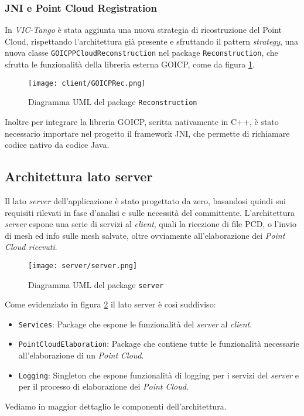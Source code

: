 \subsubsection{JNI e Point Cloud Registration}
In \emph{VIC-Tango} è stata aggiunta una nuova strategia di ricostruzione del Point Cloud, rispettando l'architettura già presente e sfruttando il pattern \emph{strategy}, una nuova classe \texttt{GOICPPCloudReconstruction} nel package \texttt{Reconstruction}, che sfrutta le funzionalità della libreria esterna GOICP, come da figura \ref{fig:GOICPRec}.
\begin{figure}[!h] 
    \centering 
    \texttt{[image: client/GOICPRec.png]} 
    \caption{Diagramma UML del package \texttt{Reconstruction}}
   \label{fig:GOICPRec}
\end{figure}
Inoltre per integrare la libreria GOICP, scritta nativamente in C++, è stato necessario importare nel progetto il framework JNI, che permette di richiamare codice nativo da codice Java.
\newpage



\subsection{Architettura lato server}
Il lato \emph{server} dell'applicazione è stato progettato da zero, basandosi quindi sui requisiti rilevati in fase d'analisi e sulle necessità del committente.
L'architettura \emph{server} espone una serie di servizi al \emph{client}, quali la ricezione di file PCD, o l'invio di mesh ed info sulle mesh salvate, oltre ovviamente all'elaborazione dei \emph{Point Cloud ricevuti}.
\begin{figure}[!h] 
    \centering 
    \texttt{[image: server/server.png]} 
    \caption{Diagramma UML del package \texttt{server}}
   \label{fig:server}
\end{figure}
Come evidenziato in figura \ref{fig:server} il lato server è così suddiviso:
\begin{itemize}
\item\texttt{Services}: Package che espone le funzionalità del \emph{server} al \emph{client}.
\item\texttt{PointCloudElaboration}: Package che contiene tutte le funzionalità necessarie all'elaborazione di un \emph{Point Cloud}.
\item\texttt{Logging}: Singleton che espone funzionalità di logging per i servizi del \emph{server} e per il processo di elaborazione dei \emph{Point Cloud}.
\end{itemize}
Vediamo in maggior dettaglio le componenti dell'architettura.

